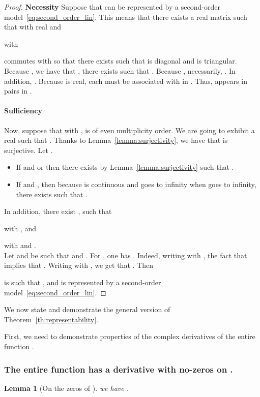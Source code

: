 \documentclass{article}
\newtheorem{lemma}{Lemma}
\begin{document}
\begin{proof}


\textbf{Necessity}
Suppose that  can be represented by a second-order model~\eqref{eq:second_order_lin}. This means that there exists a real matrix  such that 
with  real and

with 

 commutes with  so that there exists  such that  is diagonal and  is triangular. Because , we have that ,  there exists  such that . Because , necessarily, . In addition, . Because  is real, each  must be associated with  in . Thus,  appears in pairs in .
\paragraph{Sufficiency}
Now, suppose that  with ,   is of even multiplicity order. We are going to exhibit a  real such that . Thanks to Lemma~\ref{lemma:surjectivity}, we have that  is surjective. Let .
\begin{itemize}
    \item If  and  or  then there exists  by Lemma~\ref{lemma:surjectivity} such that . 
    \item If  and , then because  is continuous and goes to infinity when  goes to infinity, there exists  such that . 
  
\end{itemize}

In addition, there exist ,  such that 

with ,
and 

with  and .
\\

Let  and  be such that  and . For , one has . Indeed, writing  with , the fact that  implies that . Writing  with , we get that .
Then

is such that , and  is represented by a second-order model~\eqref{eq:second_order_lin}.
\end{proof} 

We now state and demonstrate the general version of Theorem~\ref{th:representability}.

First, we need to demonstrate properties of the complex derivatives of the entire function .

\subsubsection{The entire function  has a derivative with no-zeros on .}

\begin{lemma}[On the zeros of ]\label{lemma:zeros_derivative}
 we have .
\end{lemma}
\end{document}
